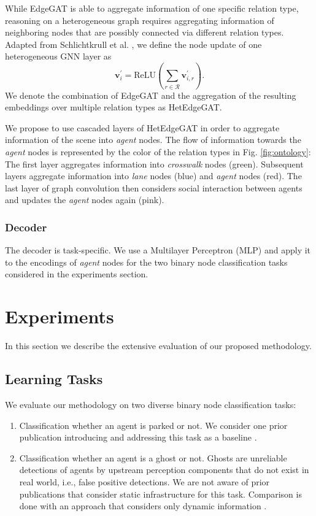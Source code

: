 \documentclass[letterpaper, 10 pt, journal, twoside]{IEEEtran}
\begin{document}
While EdgeGAT is able to aggregate information of one specific relation type, reasoning on a heterogeneous graph requires aggregating information of neighboring nodes that are possibly connected via different relation types.
Adapted from Schlichtkrull et al. \cite{Schlichtkrull2018}, we define the node update of one heterogeneous GNN layer as
\begin{equation}
\mathbf{v}_{i}^\prime = \mathrm{ReLU} \left( \sum\limits_{r \in \mathcal{R}} \mathbf{v}_{i,r}^\prime \right) \text{.}
\end{equation}
We denote the combination of EdgeGAT and the aggregation of the resulting embeddings over multiple relation types as HetEdgeGAT.

We propose to use cascaded layers of HetEdgeGAT in order to aggregate information of the scene into \textit{agent} nodes.
The flow of information towards the \textit{agent} nodes is represented by the color of the relation types in Fig. \ref{fig:ontology}:
The first layer aggregates information into \textit{crosswalk} nodes (green).
Subsequent layers aggregate information into \textit{lane} nodes (blue) and \textit{agent} nodes (red).
The last layer of graph convolution then considers social interaction between agents and updates the \textit{agent} nodes again (pink).

\subsubsection{Decoder}
The decoder is task-specific.
We use a Multilayer Perceptron (MLP) and apply it to the encodings of \textit{agent} nodes for the two binary node classification tasks considered in the experiments section.


\section{Experiments} \label{sec:experiments}
In this section we describe the extensive evaluation of our proposed methodology.

\subsection{Learning Tasks}
We evaluate our methodology on two diverse binary node classification tasks:
\begin{enumerate}
	\item Classification whether an agent is parked or not. We consider one prior publication introducing and addressing this task as a baseline \cite{Behrendt2019}.
	\item Classification whether an agent is a ghost or not. Ghosts are unreliable detections of agents by upstream perception components that do not exist in real world, i.e., false positive detections. We are not aware of prior publications that consider static infrastructure for this task. Comparison is done with an approach that considers only dynamic information \cite{Aeberhard2011}.
\end{enumerate}
\end{document}
